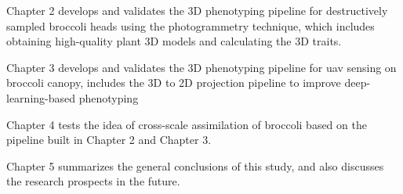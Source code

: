 Chapter 2 develops and validates the 3D phenotyping pipeline for destructively sampled broccoli heads using the photogrammetry technique, which includes obtaining high-quality plant 3D models and calculating the 3D traits.


Chapter 3 develops and validates the 3D phenotyping pipeline for \gls{uav} sensing on broccoli canopy, includes the 3D to 2D projection pipeline to improve deep-learning-based phenotyping

Chapter 4 tests the idea of cross-scale assimilation of broccoli based on the pipeline built in Chapter 2 and Chapter 3.

Chapter 5 summarizes the general conclusions of this study, and also discusses the research prospects in the future.